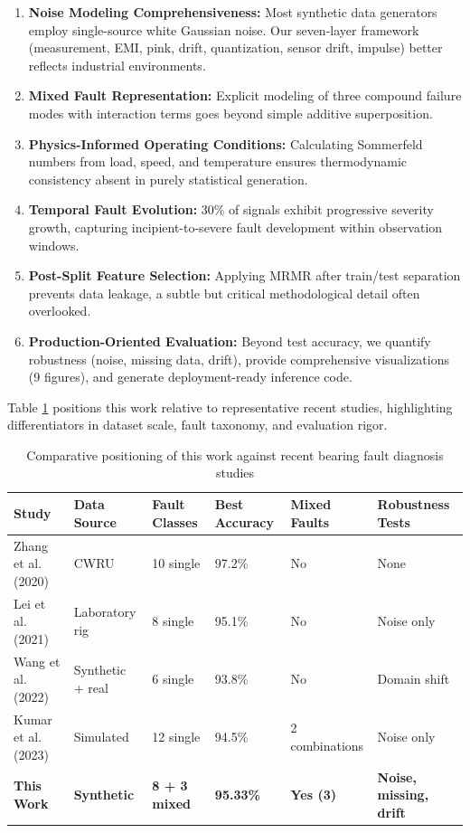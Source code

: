 \documentclass[11pt,a4paper]{article}
\begin{document}
\begin{enumerate}[leftmargin=*, itemsep=0.3em]
    \item \textbf{Noise Modeling Comprehensiveness:} Most synthetic data generators employ single-source white Gaussian noise. Our seven-layer framework (measurement, EMI, pink, drift, quantization, sensor drift, impulse) better reflects industrial environments.
    
    \item \textbf{Mixed Fault Representation:} Explicit modeling of three compound failure modes with interaction terms goes beyond simple additive superposition.
    
    \item \textbf{Physics-Informed Operating Conditions:} Calculating Sommerfeld numbers from load, speed, and temperature ensures thermodynamic consistency absent in purely statistical generation.
    
    \item \textbf{Temporal Fault Evolution:} 30\% of signals exhibit progressive severity growth, capturing incipient-to-severe fault development within observation windows.
    
    \item \textbf{Post-Split Feature Selection:} Applying MRMR after train/test separation prevents data leakage, a subtle but critical methodological detail often overlooked.
    
    \item \textbf{Production-Oriented Evaluation:} Beyond test accuracy, we quantify robustness (noise, missing data, drift), provide comprehensive visualizations (9 figures), and generate deployment-ready inference code.
\end{enumerate}

Table \ref{tab:literature_comparison} positions this work relative to representative recent studies, highlighting differentiators in dataset scale, fault taxonomy, and evaluation rigor.

\begin{table}[h]
\centering
\small
\begin{tabular}{@{}p{3.0cm}p{1.8cm}p{1.8cm}p{2cm}p{1.8cm}p{2cm}@{}}
\toprule
\textbf{Study} & \textbf{Data Source} & \textbf{Fault Classes} & \textbf{Best Accuracy} & \textbf{Mixed Faults} & \textbf{Robustness Tests} \\
\midrule
Zhang et al. (2020) & CWRU & 10 single & 97.2\% & No & None \\
Lei et al. (2021) & Laboratory rig & 8 single & 95.1\% & No & Noise only \\
Wang et al. (2022) & Synthetic + real & 6 single & 93.8\% & No & Domain shift \\
Kumar et al. (2023) & Simulated & 12 single & 94.5\% & 2 combinations & Noise only \\
\textbf{This Work} & \textbf{Synthetic} & \textbf{8 + 3 mixed} & \textbf{95.33\%} & \textbf{Yes (3)} & \textbf{Noise, missing, drift} \\
\bottomrule
\end{tabular}
\caption{Comparative positioning of this work against recent bearing fault diagnosis studies}
\label{tab:literature_comparison}
\end{table}
\end{document}
